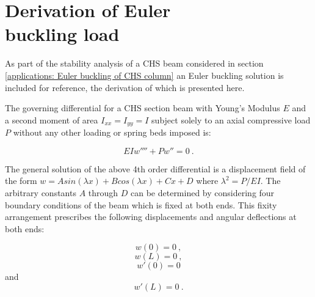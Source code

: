 \chapter[Derivation of Euler buckling load]{Derivation of Euler\\ buckling load}
\label{app:Derivation of Euler buckling load}
\renewcommand{\Thema}{Derivation of Euler buckling load}

As part of the stability analysis of a CHS beam considered in section \ref{applications: Euler buckling of CHS column} an Euler buckling solution is included for reference, the derivation of which is presented here.

The governing differential for a CHS section beam with Young's Modulus $E$  and a second moment of area $I_{xx} = I_{yy} = I$ subject solely to an axial compressive load $P$ without any other loading or spring beds imposed is:

\begin{equation} 
EI w'''' + Pw'' = 0
\label{eqapp4_1}\ .
\end{equation}

The general solution of the above 4th order differential is a displacement field of the form $w = Asin(\lambda x) + Bcos(\lambda x) +  Cx + D$ where $\lambda^2 = P/EI$. The arbitrary constants $A$ through $D$ can be determined by considering four boundary conditions of the beam which is fixed at both ends. This fixity arrangement prescribes the following displacements and angular deflections at both ends:

\begin{equation} 
w(0) = 0
\label{eqapp4_2}\ ,
\end{equation}
\begin{equation} 
w(L) = 0
\label{eqapp4_3}\ ,
\end{equation}
\begin{equation} 
w'(0) = 0
\label{eqapp4_4}
\end{equation}
and
\begin{equation} 
w'(L) = 0
\label{eqapp4_5}\ .
\end{equation}

